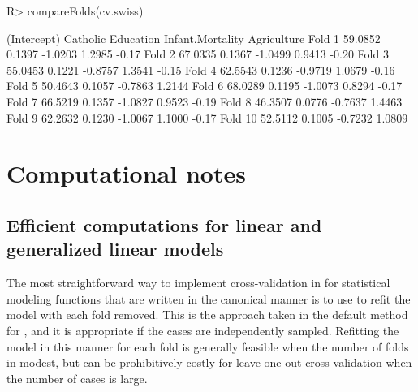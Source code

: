 \documentclass[
]{jss}
\begin{document}
\begin{CodeChunk}
\begin{CodeInput}
R> compareFolds(cv.swiss)
\end{CodeInput}
\begin{CodeOutput}
        (Intercept) Catholic Education Infant.Mortality Agriculture
Fold 1      59.0852   0.1397   -1.0203           1.2985       -0.17
Fold 2      67.0335   0.1367   -1.0499           0.9413       -0.20
Fold 3      55.0453   0.1221   -0.8757           1.3541       -0.15
Fold 4      62.5543   0.1236   -0.9719           1.0679       -0.16
Fold 5      50.4643   0.1057   -0.7863           1.2144            
Fold 6      68.0289   0.1195   -1.0073           0.8294       -0.17
Fold 7      66.5219   0.1357   -1.0827           0.9523       -0.19
Fold 8      46.3507   0.0776   -0.7637           1.4463            
Fold 9      62.2632   0.1230   -1.0067           1.1000       -0.17
Fold 10     52.5112   0.1005   -0.7232           1.0809            
\end{CodeOutput}
\end{CodeChunk}

\hypertarget{computational-notes}{%
\section{Computational notes}\label{computational-notes}}

\hypertarget{efficient-computations-for-linear-and-generalized-linear-models}{%
\subsection{Efficient computations for linear and generalized linear
models}\label{efficient-computations-for-linear-and-generalized-linear-models}}

The most straightforward way to implement cross-validation in
 for statistical modeling functions that are written in the
canonical manner is to use  to refit the model with each
fold removed. This is the approach taken in the default method for
, and it is appropriate if the cases are independently
sampled. Refitting the model in this manner for each fold is generally
feasible when the number of folds in modest, but can be prohibitively
costly for leave-one-out cross-validation when the number of cases is
large.
\end{document}
